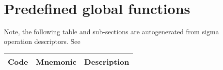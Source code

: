 \section{Predefined global functions}
\label{sec:appendix:primops}

Note, the following table and sub-sections are autogenerated from sigma operation descriptors. See 

    \scriptsize
    \begin{longtable}[h]{|l |l | p{.5\linewidth} |}
	\hline
Code &   Mnemonic   & Description \\
    \hline
     

    \end{longtable}
    \normalsize




 
